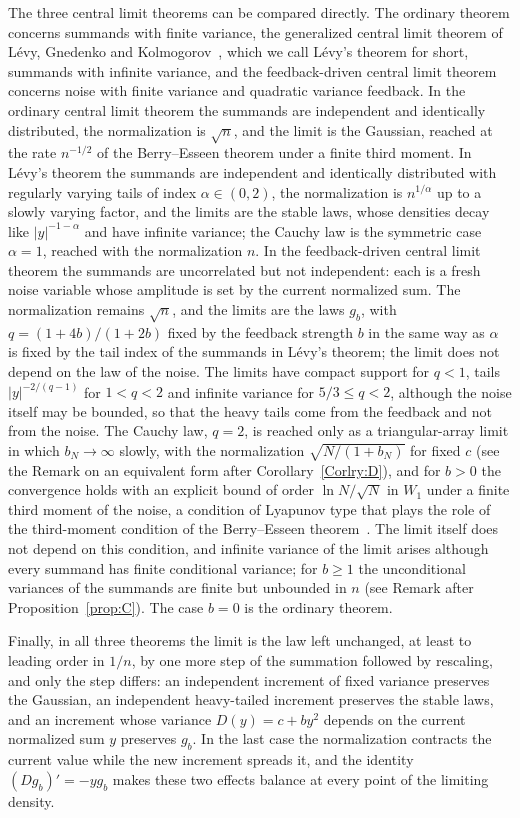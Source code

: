 \documentclass[aip,jmp,preprint,onecolumn,floatfix,superscriptaddress,nofootinbib,11pt]{revtex4-2}
\theoremstyle{plain}
\theoremstyle{remark}
\numberwithin{equation}{section}
\begin{document}
The three central limit theorems can be compared directly. The ordinary theorem concerns summands with finite variance, the generalized central limit theorem of L\'evy, Gnedenko and Kolmogorov~\cite{Levy1937,GK}, which we call L\'evy's theorem for short, summands with infinite variance, and the feedback-driven central limit theorem concerns noise with finite variance and quadratic variance feedback. In the ordinary central limit theorem the summands are independent and identically distributed, the normalization is $\sqrt n$, and the limit is the Gaussian, reached at the rate $n^{-1/2}$ of the Berry--Esseen theorem under a finite third moment. In L\'evy's theorem the summands are independent and identically distributed with regularly varying tails of index $\alpha\in(0,2)$, the normalization is $n^{1/\alpha}$ up to a slowly varying factor, and the limits are the stable laws, whose densities decay like $|y|^{-1-\alpha}$ and have infinite variance; the Cauchy law is the symmetric case $\alpha=1$, reached with the normalization $n$. In the feedback-driven central limit theorem the summands are uncorrelated but not independent: each is a fresh noise variable whose amplitude is set by the current normalized sum. The normalization remains $\sqrt n$, and the limits are the laws $g_b$, with $q=(1+4b)/(1+2b)$ fixed by the feedback strength $b$ in the same way as $\alpha$ is fixed by the tail index of the summands in L\'evy's theorem; the limit does not depend on the law of the noise. The limits have compact support for $q<1$, tails $|y|^{-2/(q-1)}$ for $1<q<2$ and infinite variance for $5/3\le q<2$, although the noise itself may be bounded, so that the heavy tails come from the feedback and not from the noise. The Cauchy law, $q=2$, is reached only as a triangular-array limit in which $b_N\to\infty$ slowly, with the normalization $\sqrt{N/(1+b_N)}$ for fixed $c$ (see the Remark on an equivalent form after Corollary~\ref{Corlry:D}), and for $b>0$ the convergence holds with an explicit bound of order $\ln N/\sqrt N$ in $W_1$ under a finite third moment of the noise, a condition of Lyapunov type that plays the role of the third-moment condition of the Berry--Esseen theorem~\cite{Feller}. The limit itself does not depend on this condition, and infinite variance of the limit arises although every summand has finite conditional variance; for $b\ge1$ the unconditional variances of the summands are finite but unbounded in $n$ (see Remark after Proposition~\ref{prop:C}). The case $b=0$ is the ordinary theorem.
 
Finally, in all three theorems the limit is the law left unchanged, at least to leading order in $1/n$, by one more step of the summation followed by rescaling, and only the step differs: an independent increment of fixed variance preserves the Gaussian, an independent heavy-tailed increment preserves the stable laws, and an increment whose variance $D(y)=c+by^{2}$ depends on the current normalized sum $y$ preserves $g_b$. In the last case the normalization contracts the current value while the new increment spreads it, and the identity $(Dg_b)'=-yg_b$ makes these two effects balance at every point of the limiting density.
 
\end{document}
